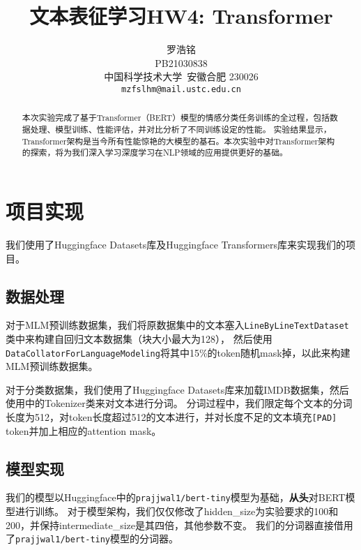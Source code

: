 \documentclass{article}
\title{文本表征学习HW4: Transformer}
\author{
  罗浩铭 \\
  PB21030838\\
  中国科学技术大学\ 安徽合肥 230026 \\
  \texttt{mzfslhm@mail.ustc.edu.cn} \\
}
\begin{document}
\maketitle


\begin{abstract}
  本次实验完成了基于Transformer（BERT）模型的情感分类任务训练的全过程，包括数据处理、模型训练、性能评估，并对比分析了不同训练设定的性能。
  实验结果显示，
  Transformer架构是当今所有性能惊艳的大模型的基石。本次实验中对Transformer架构的探索，将为我们深入学习深度学习在NLP领域的应用提供更好的基础。
\end{abstract}





\section{项目实现}
我们使用了Huggingface Datasets库及Huggingface Transformers库来实现我们的项目。
\subsection{数据处理}
对于MLM预训练数据集，我们将原数据集中的文本塞入\verb|LineByLineTextDataset|类中来构建自回归文本数据集（块大小最大为128），
然后使用\verb|DataCollatorForLanguageModeling|将其中15\%的token随机mask掉，以此来构建MLM预训练数据集。

对于分类数据集，我们使用了Huggingface Datasets库来加载IMDB数据集，然后使用中的Tokenizer类来对文本进行分词。
分词过程中，我们限定每个文本的分词长度为512，对token长度超过512的文本进行，并对长度不足的文本填充\verb|[PAD]| token并加上相应的attention mask。


\subsection{模型实现}
我们的模型以Huggingface中的\verb|prajjwal1/bert-tiny|模型为基础，\textbf{从头}对BERT模型进行训练。
对于模型架构，我们仅仅修改了hidden_size为实验要求的100和200，并保持intermediate_size是其四倍，其他参数不变。
我们的分词器直接借用了\verb|prajjwal1/bert-tiny|模型的分词器。
\end{document}
